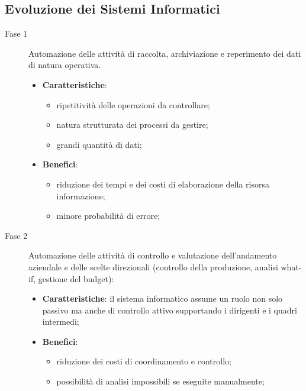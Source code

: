 \subsection{Evoluzione dei Sistemi Informatici}\label{sub:sic_evoluzione_dei_sistemi_informatici} %
\begin{description}
    \item[Fase 1] Automazione delle attività di raccolta, archiviazione e reperimento dei dati di natura operativa.
        \begin{itemize}
            \item \textbf{Caratteristiche}:
                \begin{itemize}
                    \item ripetitività delle operazioni da controllare;
                    \item natura strutturata dei processi da gestire;
                    \item grandi quantità di dati;
                \end{itemize}
            \item \textbf{Benefici}:
                \begin{itemize}
                    \item riduzione dei tempi e dei costi di elaborazione della risorsa informazione;
                    \item minore probabilità di errore;
                \end{itemize}
        \end{itemize}
    \item[Fase 2] Automazione delle attività di controllo e valutazione dell'andamento aziendale e delle scelte direzionali (controllo della produzione, analisi what-if, gestione del budget):
        \begin{itemize}
            \item \textbf{Caratteristiche}: il sistema informatico assume un ruolo non solo passivo ma anche di controllo attivo supportando i dirigenti e i quadri intermedi;
            \item \textbf{Benefici}:
                \begin{itemize}
                    \item riduzione dei costi di coordinamento e controllo;
                    \item possibilità di analisi impossibili se eseguite manualmente;
                \end{itemize}
        \end{itemize}

\end{description}
